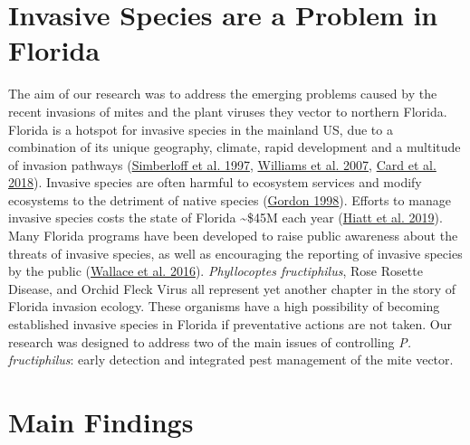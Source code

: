 \documentclass{ufdissertation}[overrideChapters] %
\begin{document}
{\hypertarget{invasive-species-are-a-problem-in-florida}{%
\section{Invasive Species are a Problem in Florida}\label{invasive-species-are-a-problem-in-florida}}

The aim of our research was to address the emerging problems caused by the recent invasions of mites and the plant viruses they vector to northern Florida. Florida is a hotspot for invasive species in the mainland US, due to a combination of its unique geography, climate, rapid development and a multitude of invasion pathways (\protect\hyperlink{ref-Simberloff1997}{Simberloff et al. 1997}, \protect\hyperlink{ref-Williams2007}{Williams et al. 2007}, \protect\hyperlink{ref-Card2018}{Card et al. 2018}). Invasive species are often harmful to ecosystem services and modify ecosystems to the detriment of native species (\protect\hyperlink{ref-Gordon1998}{Gordon 1998}). Efforts to manage invasive species costs the state of Florida \textasciitilde\$45M each year (\protect\hyperlink{ref-Hiatt2019}{Hiatt et al. 2019}). Many Florida programs have been developed to raise public awareness about the threats of invasive species, as well as encouraging the reporting of invasive species by the public (\protect\hyperlink{ref-Wallace2016}{Wallace et al. 2016}). \emph{Phyllocoptes fructiphilus}, Rose Rosette Disease, and Orchid Fleck Virus all represent yet another chapter in the story of Florida invasion ecology. These organisms have a high possibility of becoming established invasive species in Florida if preventative actions are not taken. Our research was designed to address two of the main issues of controlling \emph{P. fructiphilus}: early detection and integrated pest management of the mite vector.

\hypertarget{main-findings}{%
\section{Main Findings}\label{main-findings}}

}
\end{document}
